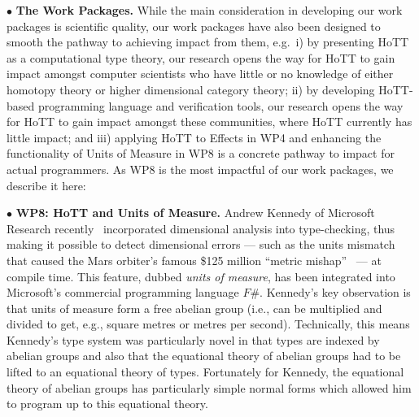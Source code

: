 \documentclass[a4paper,11pt]{article}
\begin{document}
\vspace*{0.02in}

$\bullet$ {\bf The Work Packages.} While the main consideration in
developing our work packages is scientific quality, our work
packages have also been designed to smooth the pathway to achieving
impact from them, e.g.\ i) by presenting 
HoTT as a computational type theory, our research opens the way for HoTT to gain impact
amongst computer scientists who have little or
no knowledge of either homotopy theory or higher dimensional category
theory; ii) by developing HoTT-based programming language and
verification tools, our research opens the way for HoTT to gain impact
amongst these communities, where HoTT currently has little impact; and
iii) applying HoTT to Effects in WP4 and enhancing the
functionality of Units of Measure in WP8 is a concrete pathway to
impact for actual programmers. As WP8 is the most impactful of our
work packages, we describe it here:

\vspace*{0.02in}

$\bullet$ {\bf WP8: HoTT and Units of Measure.} Andrew Kennedy of
Microsoft Research recently~\cite{aknn97} incorporated dimensional
analysis into type-checking, thus making it possible to detect
dimensional errors --- such as the units mismatch that caused the Mars
orbiter's famous \$125 million ``metric mishap''~\cite{wp99} --- at
compile time. This feature, dubbed {\em units of measure}, has been
integrated into Microsoft's commercial programming language $F\#$.
Kennedy's key observation is that units of measure form a free abelian
group (i.e., can be multiplied and divided to get, e.g., square metres
or metres per second). Technically, this means Kennedy's type system
was particularly novel in that types are indexed by abelian groups and
also that the equational theory of abelian groups
had to be lifted to an equational theory of types. Fortunately for
Kennedy, the equational theory of abelian groups has particularly
simple normal forms which allowed him to program up to this equational
theory.
\end{document}

